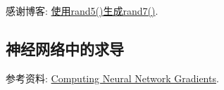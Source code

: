 感谢博客: \href{https://blog.csdn.net/u010025211/article/details/49668017}{使用rand5()生成rand7()}.

\subsection{神经网络中的求导}
参考资料: \href{https://web.stanford.edu/class/cs224n/readings/gradient-notes.pdf}{Computing Neural Network Gradients}.